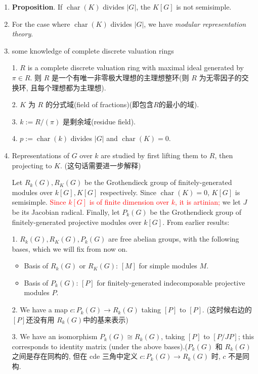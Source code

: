 \documentclass[UTF8]{ctexart}
\DeclareMathOperator{\charac}{char}
\newcommand{\abs}[1]{\left\lvert#1\right\rvert}
\begin{document}
\begin{enumerate}
\item \textbf{Proposition}. If $\charac(K)$ divides $\abs{G}$, the $K[G]$ is not semisimple.

\item For the case where $\charac(K)$ divides $\abs{G}$, we have \textit{modular representation theory}.

\item some knowledge of complete discrete valuation rings

1. $R$ is a complete discrete valuation ring with maximal ideal generated by $\pi\in R$. 则 $R$ 是一个有唯一非零极大理想的主理想整环(则 $R$ 为无零因子的交换环, 且每个理想都为主理想).

2. $K$ 为 $R$ 的分式域(field of fractions)(即包含$R$的最小的域).

3. $k := R/(\pi)$ 是剩余域(residue field).

4. $p := \charac(k)$ divides $\abs{G}$ and $\charac(K) = 0$.

\item Representations of $G$ over $k$ are studied by first lifting them to $R$, then projecting to $K$. (这句话需要进一步解释)

Let $R_k(G), R_K(G)$ be the Grothendieck group of finitely-generated modules over $k[G], K[G]$ respectively. Since $\charac(K) = 0$, $K[G]$ is semisimple. \textcolor{red}{Since $k[G]$ is of finite dimension over $k$, it is artinian;} we let $J$ be its Jacobian radical. Finally, let $P_k(G)$ be the Grothendieck group of finitely-generated projective modules over $k[G]$. From earlier results:

1. $R_k(G), R_K(G), P_k(G)$ are free abelian groups, with the following bases, which we will fix from now on.
\begin{itemize}
  \item Basis of $R_k(G)$ or $R_K(G)$: $[M]$ for simple modules $M$.
  \item Basis of $P_k(G)$: $[P]$ for finitely-generated indecomposable projective modules $P$.
\end{itemize}

2. We have a map $c : P_k(G) \to R_k(G)$ taking $[P]$ to $[P]$. (这时候右边的$[P]$还没有用 $R_k(G)$中的基来表示)

3. We have an isomorphism $P_k(G) \cong R_k(G)$, taking $[P]$ to $[P/JP]$; this corresponds to identity matrix (under the above bases).($P_k(G)$ 和 $R_k(G)$ 之间是存在同构的, 但在 cde 三角中定义 $c : P_k(G)\to R_k(G)$ 时, $c$ 不是同构.


\end{enumerate}
\end{document}
